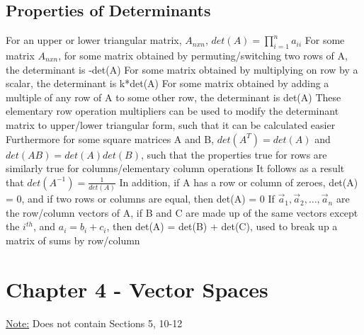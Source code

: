 \documentclass[11 pt, twoside]{article}
\newenvironment{outline*}
{
	\begin{outline}[enumerate]
	}
	{\end{outline}
}
\begin{document}
\subsection{Properties of Determinants}
\begin{outline*}
\1 For an upper or lower triangular matrix, $A_{nxn}$, $det(A) = \prod_{i = 1}^n a_{ii}$
\1 For some matrix $A_{nxn}$, for some matrix obtained by permuting/switching two rows of A, the determinant is -det(A)
\2 For some matrix obtained by multiplying on row by a scalar, the determinant is k*det(A)
\2 For some matrix obtained by adding a multiple of any row of A to some other row, the determinant is det(A)
\1 These elementary row operation multipliers can be used to modify the determinant matrix to upper/lower triangular form, such that it can be calculated easier
\1 Furthermore for some square matrices A and B, $det(A^T) = det(A)$ and $det(AB) = det(A)det(B)$, such that the properties true for rows are similarly true for columns/elementary column operations
\2 It follows as a result that $det(A^{-1}) = \frac{1}{det(A)}$
\2 In addition, if A has a row or column of zeroes, det(A) = 0, and if two rows or columns are equal, then det(A) = 0
\2 If $\vec{a}_1, \vec{a}_2, \dots, \vec{a}_n$ are the row/column vectors of A, if B and C are made up of the same vectors except the $i^{th}$, and $a_i = b_i + c_i$, then det(A) = det(B) + det(C), used to break up a matrix of sums by row/column
\end{outline*}
\section{Chapter 4 - Vector Spaces}
\underline{Note:} Does not contain Sections 5, 10-12
\end{document}
